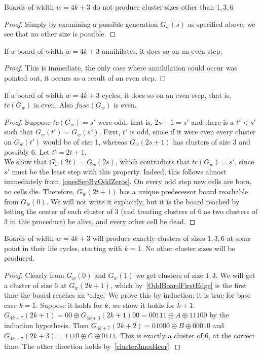 \documentclass[12pt,letterpaper]{article}
\begin{document}
\begin{cor} \label{cluster3mod4cor}
  Boards of width $w=4k+3$ do not produce cluster sizes other than $1,3,6$
\end{cor}
\begin{proof}
  Simply by examining a possible generation $G_w(s)$ as specified above, we see that no other size is possible.
\end{proof}

\begin{cor} \label{3mod4annihilateOnEven}
  If a board of width $w=4k+3$ annihilates, it does so on an even step.
\end{cor}
\begin{proof}
  This is immediate, the only case where annihilation could occur was pointed out, it occurs as a result of an even step.
\end{proof}
\begin{prop} \label{cycleOnEven3mod4}
  If a board of width $w=4k+3$ cycles, it does so on an even step, that is, $tc(G_w)$ is even. Also $fuse(G_w)$ is even. 
\end{prop}
\begin{proof}
  Suppose $tc(G_w)=s'$ were odd, that is, $2s+1=s'$ and there is a $t'<s'$ such that $G_w(t')=G_w(s')$. First, $t'$ is odd, since if it were even every cluster on $G_w(t')$ would be of size 1, whereas $G_w(2s+1)$ has clusters of size 3 and possibly 6. Let $t'=2t+1$. \\
  We show that $G_w(2t)=G_w(2s)$, which contradicts that $tc(G_w)=s'$, since $s'$ must be the least step with this property. Indeed, this follows almost immediately from~\cref{onesSepByOddZeros}. On every odd step new cells are born, no cells die. Therefore, $G_w(2t+1)$ has a unique predecessor board reachable from $G_w(0)$. We will not write it explicitly, but it is the board reached by letting the center of each cluster of 3 (and treating clusters of 6 as two clusters of 3 in this procedure) be alive, and every other cell be dead.
\end{proof}

\begin{prop} \label{cluster3mod4} %
  Boards of width $w=4k+3$ will produce exactly clusters of sizes $1,3,6$ at some point in their life cycles, starting with $k=1$. No other cluster sizes will be produced.
\end{prop}
\begin{proof}
  Clearly from $G_w(0)$ and $G_w(1)$ we get clusters of size $1,3$. We will get a cluster of size $6$ at $G_w(2k+1)$, which by~\cref{OddBoardFirstEdge} is the first time the board reaches an `edge.' We prove this by induction; it is true for base case $k=1$. Suppose it holds for $k$, we show it holds for $k+1$. $G_{4k+7}(2k+1) = 00\oplus G_{4k+3}(2k+1)00 = 00111\oplus A\oplus 11100$ by the induction hypothesis. Then $G_{4k+7}(2k+2)=01000\oplus B\oplus 00010$ and $G_{4k+7}(2k+3)=1110\oplus C\oplus 0111$. This is exactly a cluster of 6, at the correct time. The other direction holds by~\cref{cluster3mod4cor}.
\end{proof}
\end{document}
